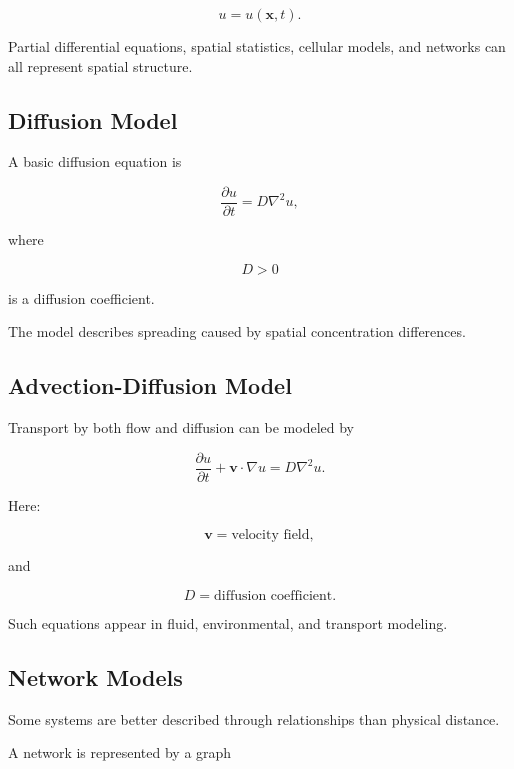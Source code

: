 \[
\boxed{
u=u(\mathbf{x},t).
}
\]

Partial differential equations, spatial statistics, cellular models, and
networks can all represent spatial structure.

\subsection{Diffusion Model}
\label{subsec:model-diffusion}

A basic diffusion equation is

\[
\boxed{
\frac{\partial u}{\partial t}
=
D\nabla^2u,
}
\]

where

\[
D>0
\]

is a diffusion coefficient.

The model describes spreading caused by spatial concentration differences.

\subsection{Advection-Diffusion Model}
\label{subsec:model-advection-diffusion}

Transport by both flow and diffusion can be modeled by

\[
\boxed{
\frac{\partial u}{\partial t}
+
\mathbf{v}\cdot\nabla u
=
D\nabla^2u.
}
\]

Here:

\[
\mathbf{v}
=
\text{velocity field},
\]

and

\[
D
=
\text{diffusion coefficient}.
\]

Such equations appear in fluid, environmental, and transport modeling.

\subsection{Network Models}
\label{subsec:model-network-models}

Some systems are better described through relationships than physical
distance.

A network is represented by a graph

